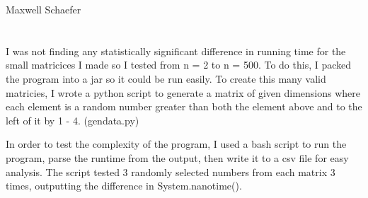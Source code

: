 \documentclass{article}
\begin{document}
    Maxwell Schaefer

    \section*{}
        I was not finding any statistically significant difference in running time for the small matricices I made so I tested from n = 2 to n = 500. To do this, I packed the program into a jar so it could be run easily. To create this many valid matricies, I wrote a python script to generate a matrix of given dimensions where each element is a random number greater than both the element above and to the left of it by 1 - 4. (gendata.py)
            
        In order to test the complexity of the program, I  used a bash script to run the program, parse the runtime from the output, then write it to a csv file for easy analysis. The script tested 3 randomly selected numbers from each matrix 3 times, outputting the difference in System.nanotime().
\end{document}
